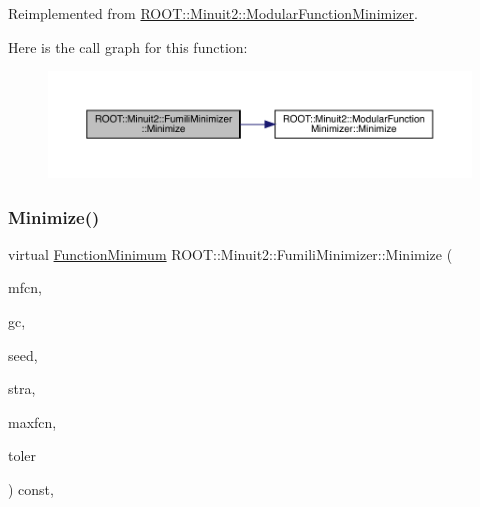 Reimplemented from \mbox{\hyperlink{classROOT_1_1Minuit2_1_1ModularFunctionMinimizer_afcfe05cabceaab80b036f5b809c6de32}{R\+O\+O\+T\+::\+Minuit2\+::\+Modular\+Function\+Minimizer}}.

Here is the call graph for this function\+:
\nopagebreak
\begin{figure}[H]
\begin{center}
\leavevmode
\includegraphics[width=350pt]{db/da1/classROOT_1_1Minuit2_1_1FumiliMinimizer_adb2739d40e10cce1923e5a21dac3f420_cgraph}
\end{center}
\end{figure}
\mbox{\label{classROOT_1_1Minuit2_1_1FumiliMinimizer_ace396e586a17ad934f18b32c8ddd054a}} 
\subsubsection{\texorpdfstring{Minimize()}{Minimize()}\hspace{0.1cm}{\footnotesize\ttfamily [21/22]}}
{\footnotesize\ttfamily virtual \mbox{\hyperlink{classROOT_1_1Minuit2_1_1FunctionMinimum}{Function\+Minimum}} R\+O\+O\+T\+::\+Minuit2\+::\+Fumili\+Minimizer\+::\+Minimize (\begin{DoxyParamCaption}\item[{const \mbox{\hyperlink{classROOT_1_1Minuit2_1_1MnFcn}{Mn\+Fcn}} \&}]{mfcn,  }\item[{const \mbox{\hyperlink{classROOT_1_1Minuit2_1_1GradientCalculator}{Gradient\+Calculator}} \&}]{gc,  }\item[{const \mbox{\hyperlink{classROOT_1_1Minuit2_1_1MinimumSeed}{Minimum\+Seed}} \&}]{seed,  }\item[{const \mbox{\hyperlink{classROOT_1_1Minuit2_1_1MnStrategy}{Mn\+Strategy}} \&}]{stra,  }\item[{unsigned int}]{maxfcn,  }\item[{double}]{toler }\end{DoxyParamCaption}) const\hspace{0.3cm}{\ttfamily [inline]}, {\ttfamily [virtual]}}



